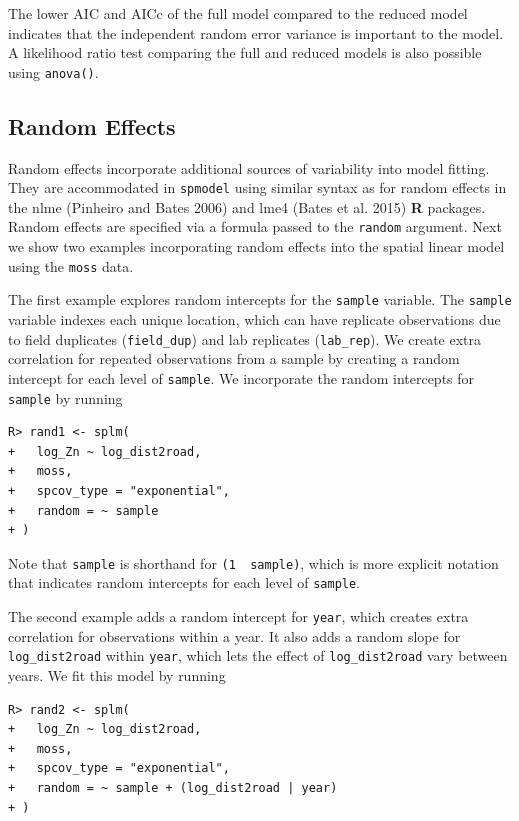\documentclass{article}
\begin{document}
The lower AIC and AICc of the full model compared to the reduced model
indicates that the independent random error variance is important to the
model. A likelihood ratio test comparing the full and reduced models is
also possible using \texttt{anova()}.

\hypertarget{random-effects}{%
\subsection{Random Effects}\label{random-effects}}

Random effects incorporate additional sources of variability into model
fitting. They are accommodated in \texttt{spmodel} using similar syntax
as for random effects in the nlme (Pinheiro and Bates 2006) and lme4
(Bates et al. 2015) \textbf{\textsf{R}} packages. Random effects are
specified via a formula passed to the \texttt{random} argument. Next we
show two examples incorporating random effects into the spatial linear
model using the \texttt{moss} data.

The first example explores random intercepts for the \texttt{sample}
variable. The \texttt{sample} variable indexes each unique location,
which can have replicate observations due to field duplicates
(\texttt{field\_dup}) and lab replicates (\texttt{lab\_rep}). We create
extra correlation for repeated observations from a sample by creating a
random intercept for each level of \texttt{sample}. We incorporate the
random intercepts for \texttt{sample} by running

\begin{verbatim}
R> rand1 <- splm(
+   log_Zn ~ log_dist2road,
+   moss,
+   spcov_type = "exponential",
+   random = ~ sample
+ )
\end{verbatim}

Note that \texttt{sample} is shorthand for
\texttt{(1\ \textbar{}\ sample)}, which is more explicit notation that
indicates random intercepts for each level of \texttt{sample}.

The second example adds a random intercept for \texttt{year}, which
creates extra correlation for observations within a year. It also adds a
random slope for \texttt{log\_dist2road} within \texttt{year}, which
lets the effect of \texttt{log\_dist2road} vary between years. We fit
this model by running

\begin{verbatim}
R> rand2 <- splm(
+   log_Zn ~ log_dist2road,
+   moss,
+   spcov_type = "exponential",
+   random = ~ sample + (log_dist2road | year)
+ )
\end{verbatim}
\end{document}
